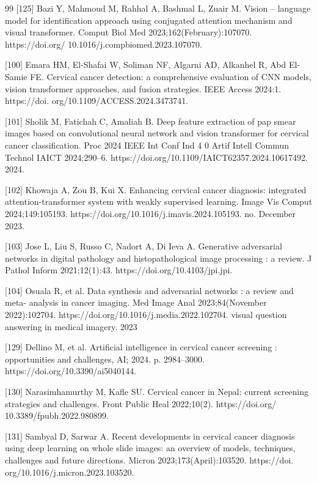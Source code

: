 \documentclass[final,5p,times,twocolumn,authoryear]{elsarticle}
\begin{document}
\begin{thebibliography}{99}
 [125] Bazi Y, Mahmoud M, Rahhal A, Bashmal L, Zuair M. Vision – language model for identification approach using conjugated attention mechanism and visual transformer. Comput Biol Med 2023;162(February):107070. https://doi.org/ 10.1016/j.compbiomed.2023.107070.

 [100] Emara HM, El-Shafai W, Soliman NF, Algarni AD, Alkanhel R, Abd El-Samie FE. Cervical cancer detection: a comprehensive evaluation of CNN models, vision transformer approaches, and fusion strategies. IEEE Access 2024:1. https://doi. org/10.1109/ACCESS.2024.3473741.

 [101] Sholik M, Fatichah C, Amaliah B. Deep feature extraction of pap smear images based on convolutional neural network and vision transformer for cervical cancer classification. Proc 2024 IEEE Int Conf Ind 4 0 Artif Intell Commun Technol IAICT 2024:290–6. https://doi.org/10.1109/IAICT62357.2024.10617492. 2024.

 [102] Khowaja A, Zou B, Kui X. Enhancing cervical cancer diagnosis: integrated attention-transformer system with weakly supervised learning. Image Vis Comput 2024;149:105193. https://doi.org/10.1016/j.imavis.2024.105193. no. December 2023.

 [103] Jose L, Liu S, Russo C, Nadort A, Di Ieva A. Generative adversarial networks in digital pathology and histopathological image processing : a review. J Pathol Inform 2021;12(1):43. https://doi.org/10.4103/jpi.jpi.

 [104] Osuala R, et al. Data synthesis and adversarial networks : a review and meta- analysis in cancer imaging. Med Image Anal 2023;84(November 2022):102704. https://doi.org/10.1016/j.media.2022.102704. visual question answering in medical imagery. 2023

 [129] Dellino M, et al. Artificial intelligence in cervical cancer screening : opportunities and challenges, AI; 2024. p. 2984–3000. https://doi.org/10.3390/ai5040144.

 [130] Narasimhamurthy M, Kafle SU. Cervical cancer in Nepal: current screening strategies and challenges. Front Public Heal 2022;10(2). https://doi.org/ 10.3389/fpubh.2022.980899.

 [131] Sambyal D, Sarwar A. Recent developments in cervical cancer diagnosis using deep learning on whole slide images: an overview of models, techniques, challenges and future directions. Micron 2023;173(April):103520. https://doi. org/10.1016/j.micron.2023.103520.


\end{thebibliography}
\end{document}
